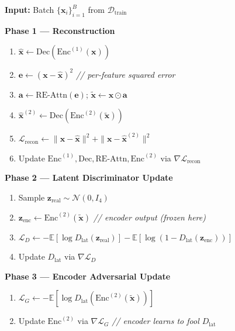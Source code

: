 \documentclass[12pt,a4paper]{article}
\begin{document}
\begin{tcolorbox}[
  title={\textbf{Algorithm 1:} RE-Attn-AAE Training (one mini-batch)},
  colback=lightgray, colframe=darkblue, fonttitle=\small\bfseries,
  breakable, enhanced
]
\small
\textbf{Input:} Batch $\{\mathbf{x}_i\}_{i=1}^{B}$ from $\mathcal{D}_\text{train}$

\medskip
\textbf{Phase 1 --- Reconstruction}
\begin{enumerate}[leftmargin=1.5em, topsep=2pt, itemsep=1pt]
  \item $\hat{\mathbf{x}} \leftarrow \text{Dec}(\text{Enc}^{(1)}(\mathbf{x}))$
  \item $\mathbf{e} \leftarrow (\mathbf{x} - \hat{\mathbf{x}})^2$
        \hfill \textit{// per-feature squared error}
  \item $\mathbf{a} \leftarrow \text{RE-Attn}(\mathbf{e})$;\quad
        $\tilde{\mathbf{x}} \leftarrow \mathbf{x} \odot \mathbf{a}$
  \item $\hat{\mathbf{x}}^{(2)} \leftarrow \text{Dec}(\text{Enc}^{(2)}(\tilde{\mathbf{x}}))$
  \item $\mathcal{L}_\text{recon} \leftarrow
        \|\mathbf{x} - \hat{\mathbf{x}}\|^2 +
        \|\mathbf{x} - \hat{\mathbf{x}}^{(2)}\|^2$
  \item Update $\text{Enc}^{(1)}, \text{Dec}, \text{RE-Attn}, \text{Enc}^{(2)}$
        via $\nabla \mathcal{L}_\text{recon}$
\end{enumerate}

\textbf{Phase 2 --- Latent Discriminator Update}
\begin{enumerate}[leftmargin=1.5em, topsep=2pt, itemsep=1pt]
  \item Sample $\mathbf{z}_\text{real} \sim \mathcal{N}(0, I_4)$
  \item $\mathbf{z}_\text{enc} \leftarrow \text{Enc}^{(2)}(\tilde{\mathbf{x}})$
        \hfill \textit{// encoder output (frozen here)}
  \item $\mathcal{L}_D \leftarrow
        -\mathbb{E}[\log D_\text{lat}(\mathbf{z}_\text{real})]
        -\mathbb{E}[\log(1 - D_\text{lat}(\mathbf{z}_\text{enc}))]$
  \item Update $D_\text{lat}$ via $\nabla \mathcal{L}_D$
\end{enumerate}

\textbf{Phase 3 --- Encoder Adversarial Update}
\begin{enumerate}[leftmargin=1.5em, topsep=2pt, itemsep=1pt]
  \item $\mathcal{L}_G \leftarrow
        -\mathbb{E}[\log D_\text{lat}(\text{Enc}^{(2)}(\tilde{\mathbf{x}}))]$
  \item Update $\text{Enc}^{(2)}$ via $\nabla \mathcal{L}_G$
        \hfill \textit{// encoder learns to fool $D_\text{lat}$}
\end{enumerate}
\end{tcolorbox}
\end{document}

